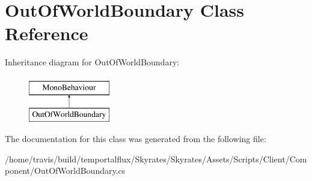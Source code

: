 \hypertarget{class_out_of_world_boundary}{\section{Out\-Of\-World\-Boundary Class Reference}
\label{class_out_of_world_boundary}
}
Inheritance diagram for Out\-Of\-World\-Boundary\-:\begin{figure}[H]
\begin{center}
\leavevmode
\includegraphics[height=2.000000cm]{class_out_of_world_boundary}
\end{center}
\end{figure}


The documentation for this class was generated from the following file\-:\begin{DoxyCompactItemize}
\item 
/home/travis/build/temportalflux/\-Skyrates/\-Skyrates/\-Assets/\-Scripts/\-Client/\-Component/Out\-Of\-World\-Boundary.\-cs\end{DoxyCompactItemize}
